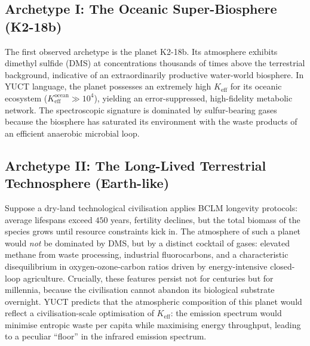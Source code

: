 \documentclass[12pt,a4paper]{article}
\begin{document}
	\subsection{Archetype I: The Oceanic Super-Biosphere (K2-18b)}
	The first observed archetype is the planet K2-18b.  Its atmosphere
	exhibits dimethyl sulfide (DMS) at concentrations thousands of times
	above the terrestrial background, indicative of an extraordinarily
	productive water-world biosphere.  In YUCT language, the
	planet possesses an extremely high $K_{\mathrm{eff}}$ for its
	oceanic ecosystem ($K_{\mathrm{eff}}^{\mathrm{ocean}} \gg 10^4$),
	yielding an error-suppressed, high-fidelity metabolic network.  The
	spectroscopic signature is dominated by sulfur-bearing gases because
	the biosphere has saturated its environment with the waste products of
	an efficient anaerobic microbial loop.
	
	\subsection{Archetype II: The Long-Lived Terrestrial\\
		Technosphere (Earth-like)}
	Suppose a dry-land technological civilisation applies BCLM longevity
	protocols: average lifespans exceed $450$ years, fertility declines,
	but the total biomass of the species grows until resource constraints
	kick in.  The atmosphere of such a planet would \emph{not} be
	dominated by DMS, but by a distinct cocktail of gases: elevated
	methane from waste processing, industrial fluorocarbons, and a
	characteristic disequilibrium in oxygen-ozone-carbon ratios driven by
	energy-intensive closed-loop agriculture.  Crucially, these features
	persist not for centuries but for millennia, because the civilisation
	cannot abandon its biological substrate overnight.  YUCT predicts that
	the atmospheric composition of this planet would reflect a
	civilisation-scale optimisation of $K_{\mathrm{eff}}$: the emission
	spectrum would minimise entropic waste per capita while maximising
	energy throughput, leading to a peculiar ``floor'' in the infrared
	emission spectrum.
	
\end{document}
